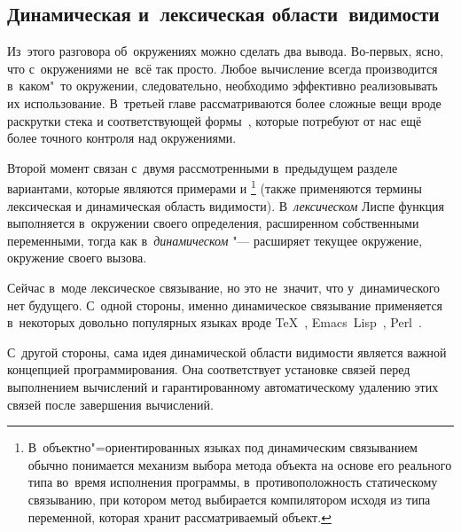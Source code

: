 \subsection{Динамическая и~лексическая области~видимости}%
\label{basics/representing-functions/ssect:dynamic-and-lexical-binding}

Из~этого разговора об~окружениях можно сделать два вывода. Во-первых, ясно,
что с~окружениями не~всё так просто. Любое вычисление всегда производится
в~каком"~то окружении, следовательно, необходимо эффективно реализовывать их
использование. В~третьей главе рассматриваются более сложные вещи вроде
раскрутки стека и соответствующей формы~, которые потребуют
от нас ещё более точного контроля над окружениями.

Второй момент связан с~двумя рассмотренными в~предыдущем разделе вариантами,
которые являются примерами  и \footnote{В~объектно"=ориентированных языках под динамическим
связыванием обычно понимается механизм выбора метода объекта на основе его
реального типа во~время исполнения программы, в~противоположность статическому
связыванию, при котором метод выбирается компилятором исходя из типа переменной,
которая хранит рассматриваемый объект.} (также применяются термины лексическая и
динамическая область видимости). В~\emph{лексическом} Лиспе функция выполняется
в~окружении своего определения, расширенном собственными переменными, тогда как
в~\emph{динамическом} "--- расширяет текущее окружение, окружение своего вызова.

Сейчас в~моде лексическое связывание, но это не~значит, что у~динамического нет
будущего. С~одной стороны, именно динамическое связывание применяется
в~некоторых довольно популярных языках вроде \TeX~\cite{knu84},
Emacs~Lisp~\cite{llst93}, Perl~\cite{ws91}.

С~другой стороны, сама идея динамической области видимости является важной
концепцией программирования. Она соответствует установке связей перед
выполнением вычислений и гарантированному автоматическому удалению этих связей
после завершения вычислений.

